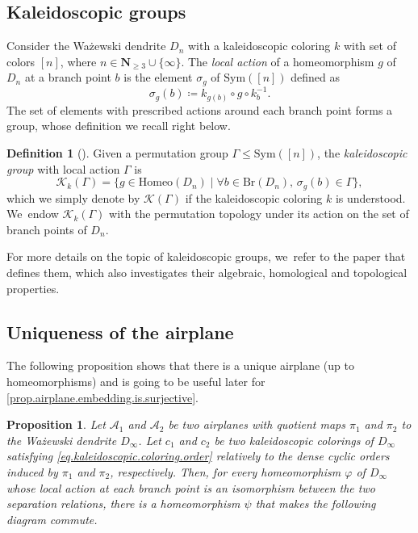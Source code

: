 \documentclass[JEP,XML,SOM,Unicode,NoFloatCountersInSection,published]{cedram}
\let\ts\textstyle
\theoremstyle{plain}
\newtheorem{proposition}[theorem]{Proposition}
\theoremstyle{definition}
\newtheorem{definition}[theorem]{Definition}
\theoremstyle{remark}
\newcommand{\Sym}{\mathrm{Sym}}
\newcommand{\Homeo}{\mathrm{Homeo}}
\newcommand{\A}{\mathcal{A}}
\newcommand{\K}{\mathcal{K}}
\newcommand{\Br}{\mathrm{Br}}
\begin{document}
\subsection{Kaleidoscopic groups}

Consider the Ważewski dendrite $D_n$ with a kaleidoscopic coloring $k$ with set of colors $[n]$, where $n \in \mathbf{N}_{\geq 3} \cup \{\infty\}$.
The \emph{local action} of a homeomorphism $g$ of $D_n$ at a branch point $b$ is the element $\sigma_g$ of $\Sym([n])$ defined as
\[
 \sigma_g(b) \coloneqq k_{g(b)} \circ g \circ k_b^{-1}. 
\]
The set of elements with prescribed actions around each branch point forms a group, whose definition we recall right below.

\begin{definition}[{\cite[Def.\,3.8]{Kaleidoscopic}}]
\label{def.kaleidoscopic.group}
Given a permutation group $\Gamma \leq \Sym([n])$, the \emph{kaleidoscopic group} with local action $\Gamma$ is
\[
 \K_k(\Gamma) = \{ g \in \Homeo(D_n) \mid \forall b \in \Br(D_n),\, \sigma_g(b) \in \Gamma \}, 
\]
which we simply denote by $\K(\Gamma)$ if the kaleidoscopic coloring $k$ is understood. We~endow $\K_k(\Gamma)$ with the permutation topology under its action on the set of branch points of $D_n$.
\end{definition}

For more details on the topic of kaleidoscopic groups, we~refer to the paper \cite{Kaleidoscopic} that defines them, which also investigates their algebraic, homological and topological properties.

\subsection{Uniqueness of the airplane}

The following proposition shows that there is a unique airplane (up to homeomorphisms) and is going to be useful later for \cref{prop.airplane.embedding.is.surjective}.

\begin{proposition}
\label{prop.airplane.surjectivity}
Let $\A_1$ and $\A_2$ be two airplanes with quotient maps $\pi_1$ and $\pi_2$ to the Ważewski dendrite $D_\infty$.
Let $c_1$ and $c_2$ be two kaleidoscopic colorings of $D_\infty$ satisfying \cref{eq.kaleidoscopic.coloring.order} relatively to the dense cyclic orders induced by $\pi_1$ and $\pi_2$, respectively.
Then, for every homeomorphism $\varphi$ of $D_\infty$ whose local action at each branch point is an isomorphism between the two separation relations, there is a homeomorphism $\psi$ that makes the following diagram commute.
\begin{center}
\end{center}
\end{proposition}
\end{document}
